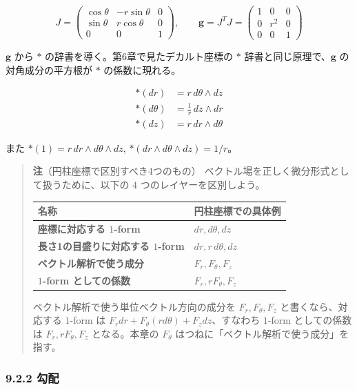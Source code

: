 \documentclass[a4paper,12pt,openany]{book}
\begin{document}
\[J = \begin{pmatrix}
\cos\theta & -r\sin\theta & 0 \\
\sin\theta & r\cos\theta & 0 \\
0 & 0 & 1
\end{pmatrix}, \qquad
\mathbf{g} = J^T J = \begin{pmatrix}
1 & 0 & 0 \\
0 & r^2 & 0 \\
0 & 0 & 1
\end{pmatrix}\]

\(\mathbf{g}\) から \(\ast\) の辞書を導く。第6章で見たデカルト座標の
\(\ast\) 辞書と同じ原理で、\(\mathbf{g}\) の対角成分の平方根が \(\ast\)
の係数に現れる。

\[\begin{aligned}
\ast(dr) &= r\,d\theta \wedge dz \\
\ast(d\theta) &= \frac{1}{r}\,dz \wedge dr \\
\ast(dz) &= r\,dr \wedge d\theta
\end{aligned}\]

また \(\ast(1) = r\,dr\wedge d\theta\wedge dz\),
\(\ast(dr\wedge d\theta\wedge dz) = 1/r\)。

\begin{quote}
\textbf{注}（円柱座標で区別すべき4つのもの）
ベクトル場を正しく微分形式として扱うために、以下の 4
つのレイヤーを区別しよう。

\begin{longtable}[]{@{}ll@{}}
\toprule\noalign{}
名称 & 円柱座標での具体例 \\
\midrule\noalign{}
\endhead
\bottomrule\noalign{}
\endlastfoot
\textbf{座標に対応する $1$-form} & \(dr, d\theta, dz\) \\
\textbf{長さ1の目盛りに対応する $1$-form} & \(dr, r\,d\theta, dz\) \\
\textbf{ベクトル解析で使う成分} & \(F_r, F_\theta, F_z\) \\
\textbf{$1$-form としての係数} & \(F_r, rF_\theta, F_z\) \\
\end{longtable}

ベクトル解析で使う単位ベクトル方向の成分を \(F_r,F_\theta,F_z\)
と書くなら、対応する \(1\)-form は
\(F_r dr + F_\theta (r d\theta) + F_z dz\)、すなわち \(1\)-form
としての係数は \(F_r,rF_\theta,F_z\) となる。本章の \(F_\theta\)
はつねに「ベクトル解析で使う成分」を指す。
\end{quote}

\hypertarget{ux52feux914d-2}{%
\subsubsection{9.2.2 勾配}\label{ux52feux914d-2}}
\end{document}

